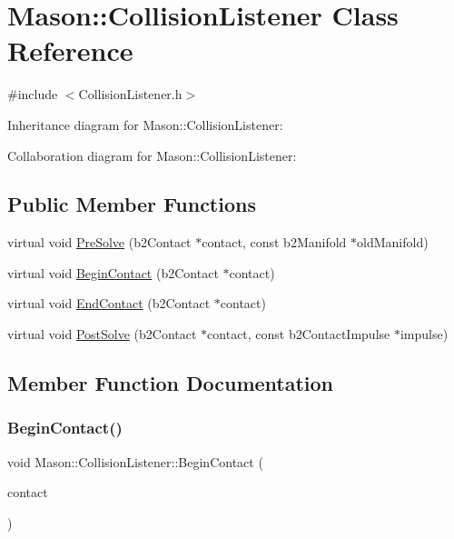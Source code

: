 \hypertarget{class_mason_1_1_collision_listener}{}\section{Mason\+:\+:Collision\+Listener Class Reference}
\label{class_mason_1_1_collision_listener}


{\ttfamily \#include $<$Collision\+Listener.\+h$>$}



Inheritance diagram for Mason\+:\+:Collision\+Listener\+:


Collaboration diagram for Mason\+:\+:Collision\+Listener\+:
\subsection*{Public Member Functions}
\begin{DoxyCompactItemize}
\item 
virtual void \hyperlink{class_mason_1_1_collision_listener_accc6ff23dcbf8cbef31e68fe3c56837a}{Pre\+Solve} (b2\+Contact $\ast$contact, const b2\+Manifold $\ast$old\+Manifold)
\item 
virtual void \hyperlink{class_mason_1_1_collision_listener_afceef187bf2f12230da95c98699fef29}{Begin\+Contact} (b2\+Contact $\ast$contact)
\item 
virtual void \hyperlink{class_mason_1_1_collision_listener_a58250c23f5fe17721c186a9d22408576}{End\+Contact} (b2\+Contact $\ast$contact)
\item 
virtual void \hyperlink{class_mason_1_1_collision_listener_a974aee4f4b2068706e87a887c842eb66}{Post\+Solve} (b2\+Contact $\ast$contact, const b2\+Contact\+Impulse $\ast$impulse)
\end{DoxyCompactItemize}


\subsection{Member Function Documentation}
\hypertarget{class_mason_1_1_collision_listener_afceef187bf2f12230da95c98699fef29}{}\label{class_mason_1_1_collision_listener_afceef187bf2f12230da95c98699fef29} 
\subsubsection{\texorpdfstring{Begin\+Contact()}{BeginContact()}}
{\footnotesize\ttfamily void Mason\+::\+Collision\+Listener\+::\+Begin\+Contact (\begin{DoxyParamCaption}\item[{b2\+Contact $\ast$}]{contact }\end{DoxyParamCaption})\hspace{0.3cm}{\ttfamily [virtual]}}

